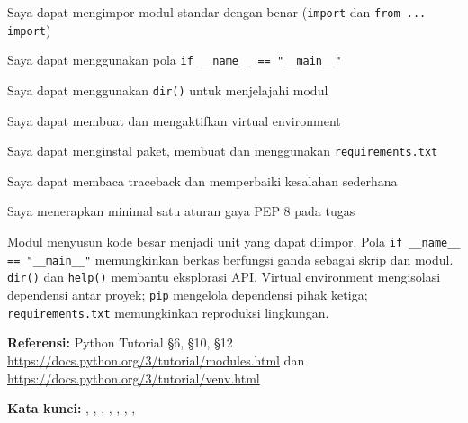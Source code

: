 \documentclass[../main.tex]{subfiles}
\begin{document}
\begin{checklist}
  \item Saya dapat mengimpor modul standar dengan benar (\texttt{import} dan \texttt{from ... import})
  \item Saya dapat menggunakan pola \texttt{if \_\_name\_\_ == "\_\_main\_\_"}
  \item Saya dapat menggunakan \texttt{dir()} untuk menjelajahi modul
  \item Saya dapat membuat dan mengaktifkan virtual environment
  \item Saya dapat menginstal paket, membuat dan menggunakan \texttt{requirements.txt}
  \item Saya dapat membaca traceback dan memperbaiki kesalahan sederhana
  \item Saya menerapkan minimal satu aturan gaya PEP 8 pada tugas
\end{checklist}

\begin{rangkuman}
Modul menyusun kode besar menjadi unit yang dapat diimpor. Pola \texttt{if \_\_name\_\_ == "\_\_main\_\_"} memungkinkan berkas berfungsi ganda sebagai skrip dan modul. \texttt{dir()} dan \texttt{help()} membantu eksplorasi API. Virtual environment mengisolasi dependensi antar proyek; \texttt{pip} mengelola dependensi pihak ketiga; \texttt{requirements.txt} memungkinkan reproduksi lingkungan.

\textbf{Referensi:} {\small Python Tutorial §6, §10, §12 \url{https://docs.python.org/3/tutorial/modules.html} dan \url{https://docs.python.org/3/tutorial/venv.html}}

\textbf{Kata kunci:} , , , , , , , 
\end{rangkuman}
\end{document}
